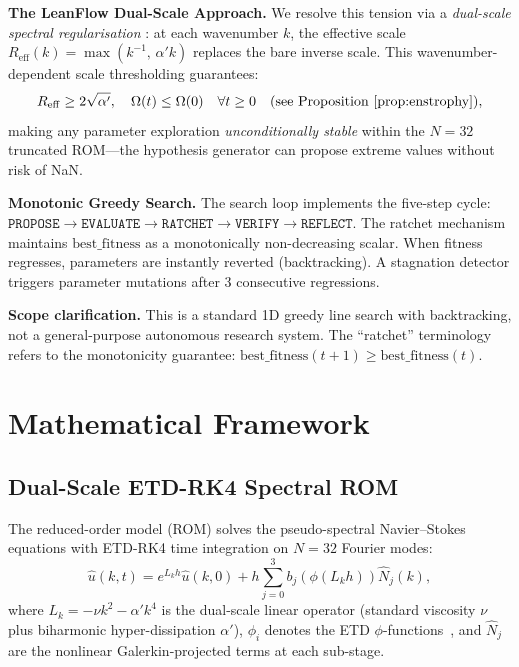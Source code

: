 \documentclass[10pt,twocolumn]{article}
\begin{document}
\textbf{The LeanFlow Dual-Scale Approach.}
We resolve this tension via a \emph{dual-scale spectral regularisation}
\cite{callens2026leanflow}: at each wavenumber $k$, the effective scale
$R_{\mathrm{eff}}(k) = \max(k^{-1},\,\alpha' k)$ replaces the bare
inverse scale. This wavenumber-dependent scale thresholding guarantees:
\begin{equation}
  R_{\mathrm{eff}} \ge 2\sqrt{\alpha'}, \quad
  \Omega(t) \le \Omega(0) \quad \forall t \ge 0
  \quad \text{(see Proposition~\ref{prop:enstrophy})},
  \label{eq:reff}
\end{equation}
making any parameter exploration \emph{unconditionally stable} within the
$N{=}32$ truncated ROM---the hypothesis generator can propose extreme
values without risk of NaN.

\textbf{Monotonic Greedy Search.}
The search loop implements the five-step cycle:
$\mathtt{PROPOSE} \to \mathtt{EVALUATE} \to \mathtt{RATCHET} \to \mathtt{VERIFY} \to \mathtt{REFLECT}$.
The ratchet mechanism maintains $\text{best\_fitness}$ as a monotonically
non-decreasing scalar. When fitness regresses, parameters are instantly
reverted (backtracking). A stagnation detector triggers parameter
mutations after 3 consecutive regressions.

\textbf{Scope clarification.}
This is a standard 1D greedy line search with backtracking, not a
general-purpose autonomous research system. The ``ratchet'' terminology
refers to the monotonicity guarantee: $\text{best\_fitness}(t+1) \ge
\text{best\_fitness}(t)$.

\section{Mathematical Framework}
\label{sec:math}

\subsection{Dual-Scale ETD-RK4 Spectral ROM}

The reduced-order model (ROM) solves the pseudo-spectral Navier--Stokes
equations with ETD-RK4 time integration on $N=32$ Fourier modes:
\begin{equation}
  \hat{u}(k,t) = e^{L_k h}\hat{u}(k,0)
  + h \sum_{j=0}^{3} b_j(\phi(L_k h)) \hat{N}_j(k),
\end{equation}
where $L_k = -\nu k^2 - \alpha' k^4$ is the dual-scale linear operator
(standard viscosity $\nu$ plus biharmonic hyper-dissipation $\alpha'$),
$\phi_i$ denotes the ETD $\phi$-functions~\cite{cox2002etd}, and $\hat{N}_j$ are the
nonlinear Galerkin-projected terms at each sub-stage.
\end{document}
